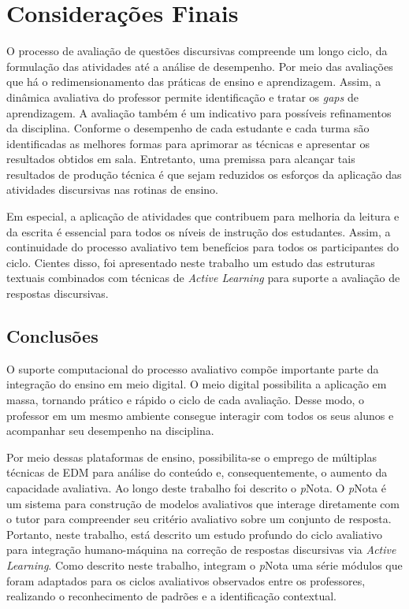 \chapter{Considerações Finais}
\label{cap-conclusao}

O processo de avaliação de questões discursivas compreende um longo ciclo, da formulação das atividades até a análise de desempenho. Por meio das avaliações que há o redimensionamento das práticas de ensino e aprendizagem. Assim, a dinâmica avaliativa do professor permite identificação e tratar os \textit{gaps} de aprendizagem. A avaliação também é um indicativo para possíveis refinamentos da disciplina. Conforme o desempenho de cada estudante e cada turma são identificadas as melhores formas para aprimorar as técnicas e apresentar os resultados obtidos em sala. Entretanto, uma premissa para alcançar tais resultados de produção técnica é que sejam reduzidos os esforços da aplicação das atividades discursivas nas rotinas de ensino.

Em especial, a aplicação de atividades que contribuem para melhoria da leitura e da escrita é essencial para todos os níveis de instrução dos estudantes. Assim, a continuidade do processo avaliativo tem benefícios para todos os participantes do ciclo. Cientes disso, foi apresentado neste trabalho um estudo das estruturas textuais combinados com técnicas de \textit{Active Learning} para suporte a avaliação de respostas discursivas.


\section{Conclusões}

O suporte computacional do processo avaliativo compõe importante parte da integração do ensino em meio digital. O meio digital possibilita a aplicação em massa, tornando prático e rápido o ciclo de cada avaliação. Desse modo, o professor em um mesmo ambiente consegue interagir com todos os seus alunos e acompanhar seu desempenho na disciplina. 

Por meio dessas plataformas de ensino, possibilita-se o emprego de múltiplas técnicas de EDM para análise do conteúdo e, consequentemente, o aumento da capacidade avaliativa. Ao longo deste trabalho foi descrito o \textit{p}Nota. O \textit{p}Nota é um sistema para construção de modelos avaliativos que interage diretamente com o tutor para compreender seu critério avaliativo sobre um conjunto de resposta. Portanto, neste trabalho, está descrito um estudo profundo do ciclo avaliativo para integração humano-máquina na correção de respostas discursivas via \textit{Active Learning}. Como descrito neste trabalho, integram o \textit{p}Nota uma série módulos que foram adaptados para os ciclos avaliativos observados entre os professores, realizando o reconhecimento de padrões e a identificação contextual.


